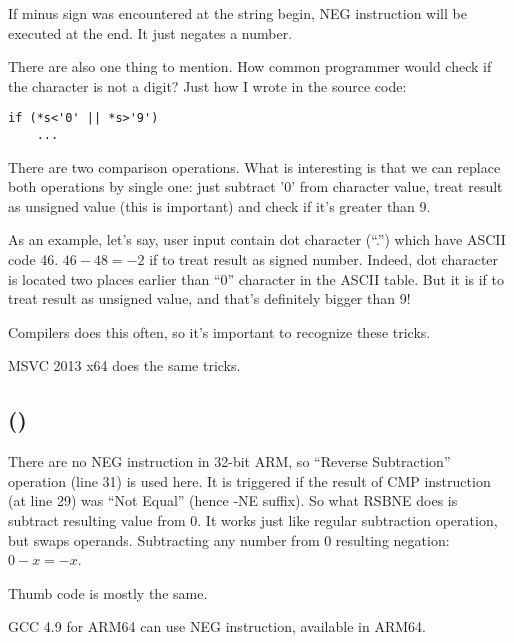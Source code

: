 

If minus sign was encountered at the string begin, 
NEG instruction will be executed at the end.
It just negates a number.

There are also one thing to mention. 
How common programmer would check if the character is not a digit?
Just how I wrote in the source code:

\begin{lstlisting}
if (*s<'0' || *s>'9')
    ...
\end{lstlisting}

There are two comparison operations.
What is interesting is that we can replace both operations by single one: 
just subtract '0' from character value,
treat result as unsigned value (this is important) and check if it's greater than 9.

As an example, let's say, user input contain dot character (``.'') which have \ac{ASCII} code 46.
$46-48=-2$ if to treat result as signed number.
Indeed, dot character is located two places earlier than ``0'' character in the \ac{ASCII} table.
But it is  if to treat result as unsigned value, and that's definitely bigger than 9!

Compilers does this often, so it's important to recognize these tricks.

\Optimizing MSVC 2013 x64 does the same tricks.

\subsection{\OptimizingKeilVI (\ARMMode)}



There are no NEG instruction in 32-bit ARM, so ``Reverse Subtraction'' operation (line 31) 
is used here.
It is triggered if the result of CMP instruction (at line 29) was ``Not Equal'' (hence -NE suffix).
So what RSBNE does is subtract resulting value from 0.
It works just like regular subtraction operation, but swaps operands.
Subtracting any number from 0 resulting negation: $0-x=-x$.

Thumb code is mostly the same.

GCC 4.9 for ARM64 can use NEG instruction, available in ARM64.

\fi
